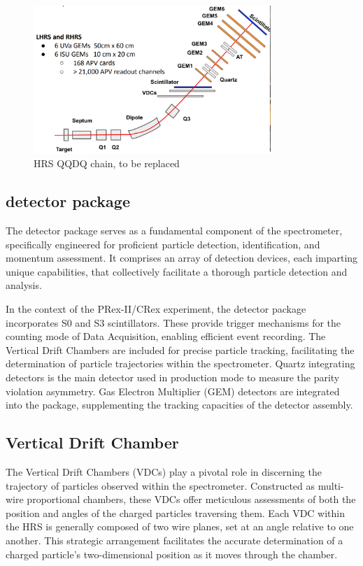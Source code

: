 \begin{figure}
    \centering
    \includegraphics[width=0.8\textwidth]{images/chap5/gem_apparatus_in_hrs_2d.png}
    \caption{HRS QQDQ chain, to be replaced}
    \label{fig:enter-label}
\end{figure}

\subsection{detector package}

The detector package serves as a fundamental component of the spectrometer, specifically engineered for proficient particle detection, identification, and momentum assessment. It comprises an array of detection devices, each imparting unique capabilities, that collectively facilitate a thorough particle detection and analysis.

In the context of the PRex-II/CRex experiment, the detector package incorporates S0 and S3 scintillators. These provide trigger mechanisms for the counting mode of Data Acquisition, enabling efficient event recording. The Vertical Drift Chambers are included for precise particle tracking, facilitating the determination of particle trajectories within the spectrometer. Quartz integrating detectors is the main detector used in production mode to measure the parity violation asymmetry. Gas Electron Multiplier (GEM) detectors are integrated into the package, supplementing the tracking capacities of the detector assembly. 

\subsection{Vertical Drift Chamber}

The Vertical Drift Chambers (VDCs) play a pivotal role in discerning the trajectory of particles observed within the spectrometer. Constructed as multi-wire proportional chambers, these VDCs offer meticulous assessments of both the position and angles of the charged particles traversing them. Each VDC within the HRS is generally composed of two wire planes, set at an angle relative to one another. This strategic arrangement facilitates the accurate determination of a charged particle's two-dimensional position as it moves through the chamber.

